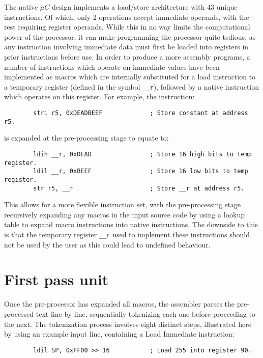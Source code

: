 \documentclass[12pt,twoside]{report}
\begin{document}
The native $\mu C$ design implements a load/store architecture with 43
unique instructions. Of which, only 2 operations accept immediate
operands, with the rest requiring register operands. While this in no
way limits the computational power of the processor, it can make
programming the processor quite tedious, as any instruction involving
immediate data must first be loaded into registers in prior
instructions before use. In order to produce a more assembly programs,
a number of instructions which operate on immediate values have been
implemented as macros which are internally substituted for a load
instruction to a temporary register (defined in the symbol
\texttt{\_\_r}), followed by a native instruction which operates on
this register. For example, the instruction:

\begin{verbatim}
        stri r5, 0xDEADBEEF             ; Store constant at address r5.
\end{verbatim}

is expanded at the pre-processing stage to equate to:

\begin{verbatim}
        ldih __r, 0xDEAD                ; Store 16 high bits to temp register.
        ldil __r, 0xBEEF                ; Store 16 low bits to temp register.
        str r5, __r                     ; Store __r at address r5.
\end{verbatim}

This allows for a more flexible instruction set, with the
pre-processing stage recursively expanding any macros in the input
source code by using a lookup table to expand macro instructions into
native instructions. The downside to this is that the temporary
register \texttt{\_\_r} used to implement these instructions should
not be used by the user as this could lead to undefined behaviour.

\section{First pass unit}

Once the pre-processor has expanded all macros, the assembler parses
the pre-processed text line by line, sequentially tokenizing each one
before proceeding to the next. The tokenization process involves eight
distinct steps, illustrated here by using an example input line,
containing a Load Immediate instruction:

\begin{verbatim}
        ldil SP, 0xFF00 >> 16           ; Load 255 into register 90.
\end{verbatim}
\end{document}
